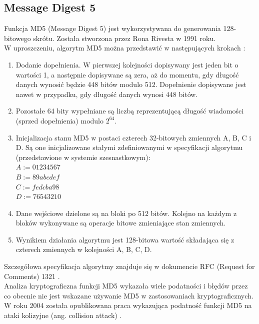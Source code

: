 \subsection{Message Digest 5}
Funkcja MD5 (Message Digest 5) jest wykorzystywana do generowania 128-bitowego skrótu. Została stworzona przez Rona Rivesta w 1991 roku. \\
W uproszczeniu, algorytm MD5 można przedstawić w następujących krokach \cite{crypto101}:
\begin{enumerate}
	\item Dodanie dopełnienia. W pierwszej kolejności dopisywany jest jeden bit o wartości 1, a następnie dopisywane są zera, aż do momentu, gdy długość danych wynosić będzie 448 bitów modulo 512. Dopełnienie dopisywane jest nawet w przypadku, gdy długość danych wynosi 448 bitów.
	\item Pozostałe 64 bity wypełniane są liczbą reprezentującą długość wiadomości (sprzed dopełnienia) modulo $2^{64}$. 
	\item Inicjalizacja stanu MD5 w postaci czterech 32-bitowych zmiennych A, B, C i D. Są one inicjalizowane stałymi zdefiniowanymi w specyfikacji algorytmu (przedstawione w systemie szesnastkowym): \\
		$A := 01 23 45 67$ \\
		$B := 89 ab cd ef$ \\
		$C := fe dc ba 98$ \\
		$D := 76 54 32 10$ 
	\item Dane wejściowe dzielone są na bloki po 512 bitów. Kolejno na każdym z bloków wykonywane są operacje bitowe zmieniające stan zmiennych. 
	\item Wynikiem działania algorytmu jest 128-bitowa wartość składająca się z czterech zmiennych w kolejności A, B, C, D.
\end{enumerate} 
Szczegółowa specyfikacja algorytmy znajduje się w dokumencie RFC (Request for Comments) 1321 \cite{md5rfc}. \\
Analiza kryptograficzna funkcji MD5 wykazała wiele podatności i błędów przez co obecnie nie jest wskazane używanie MD5 w zastosowaniach kryptograficznych. 
W roku 2004 została opublikowana praca wykazująca podatność funkcji MD5 na ataki kolizyjne (ang. collision attack) \cite{md5cert}. 

